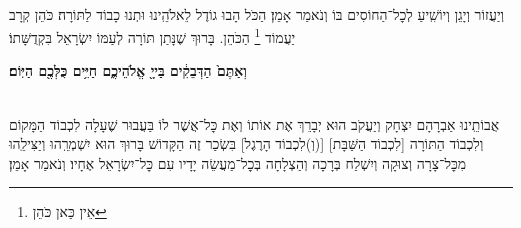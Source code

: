 \documentclass[twoside, openany, parskip=half, 11pt]{book}
\begin{document}
\avharachamim

\\
וְיַעֲזוֹר וְיָגֵן וְיוֹשִֽׁיעַ לְכׇל־הַחוֹסִים בּוֹ וְנֹאמַר אָמֵן׃
הַכֹּל הָבוּ גוֹדֶל לֵאלֹהֵֽינוּ וּתְנוּ כָבוֹד לַתּוֹרָה׃ כֹּהֵן קְרָב יַעֲמוֹד
\footnote{ אֵין כַּאן כֹּהֵן}
הַכֹּהֵן. בָּרוּךְ שֶׁנָּתַן תּוֹרָה לְעַמּוֹ יִשְׂרָאֵל בִּקְדֻשָּׁתוֹ׃

\textbf{וְאַתֶּם֙ הַדְּבֵקִ֔ים בַּייָ֖ אֱלֹהֵיכֶ֑ם חַיִּ֥ים כֻּלְּכֶ֖ם הַיּֽוֹם׃} 

\torahbarachu

\hagomel

\\
אֲבוֹתֵֽינוּ אַבְרָהָם יִצְחָק וְיַעֲקֹב הוּא יְבָרֵךְ אֶת
אוֹתוֹ וְאֶת כׇּל־אֲשֶׁר לוֹ
בַּעֲבוּר שֶׁעָלָה לִכְבוֹד הַמָּקוֹם וְלִכְבוֹד הַתּוֹרָה
[לִכְבוֹד הַשַּׁבָּת]
[(וְ)לִכְבוֹד הָרֶגֶל]
בִּשְׂכַר זֶה הַקָּדוֹשׁ בָּרוּךְ הוּא יִשְׁמְרֵֽהוּ וְיַצִּילֵֽהוּ מִכׇּל־צָרָה וְצוּקָה וְיִשְׁלַח בְּרָכָה וְהַצְלָחָה בְּכׇל־מַעֲשֵׂה יָדָיו עִם כׇּל־יִשְׂרָאֵל אֶחָיו׃ וְנֹאמַר אָמֵן׃
\end{document}
